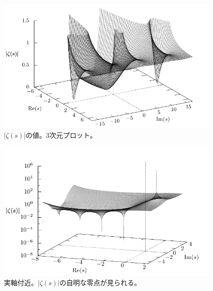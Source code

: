 \documentclass[11pt,b5paper,papersize,dvipdfmx]{jsbook}
\begin{document}
\clearpage

%
\begin{figure}[p]
  \centering
  \includegraphics{nkym/gnuplot/zeta03/complex-main.pdf}
  \caption{$|\zeta(s)|$の値。3次元プロット。}
  \label{fig:complex-zeta}
\end{figure}
%

%
\begin{figure}[p]
  \centering
  \includegraphics{nkym/gnuplot/zeta03/jimei-main.pdf}
  \caption{実軸付近。$|\zeta(s)|$の自明な零点が見られる。}
  \label{fig:3d-jimei-zeta}
\end{figure}
%

\clearpage
\end{document}
